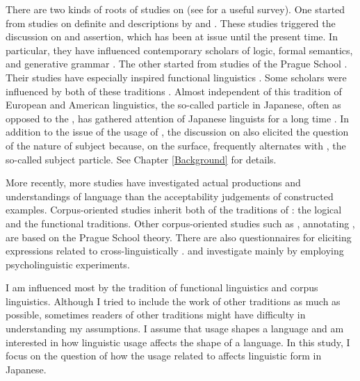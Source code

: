 There are two kinds of roots of studies on 
(see  for a useful survey).
One started from studies on definite and  descriptions by  and .
These studies triggered the discussion on  and assertion,
which has been at issue until the present time.
In particular, they have influenced contemporary scholars of logic, formal semantics, and generative grammar \cite{chomsky65,jackendoff72,selkirk84,rooth85,rizzi97,erteschik-shir97,erteschik-shir07,buring07,ishihara11,krifkamusan12,endo14}.
The other started from studies of the Prague School \cite{mathesius28,mathesius29,sgall67,firbas75}.
Their studies have especially inspired functional linguistics
\cite{bolinger65,halliday67,kuno73,gundel74,chafe76,chafe94,prince81,givon83,tomlin86,lambrecht94,birnerward98,birnerward09}.
Some scholars were influenced by both of these traditions
\cite{vallduvi90,steedman91,vallduvivilkuna98}.%
Almost independent of this tradition of European and American linguistics,
the so-called  particle  in Japanese,
often as opposed to the  ,
has gathered attention of Japanese linguists for a long time \cite{matsushita28,yamada36,tokieda50,mikami53,mikami60,onoe81,kinsui95,kikuchi95,noda96,masuoka00,masuoka12}.
In addition to the issue of the usage of ,
the discussion on  also elicited the question of the nature of subject
because, on the surface,  frequently alternates with ,
the so-called subject particle.
See Chapter \ref{Background} for details.

More recently,
more studies have investigated actual productions and understandings of language than the acceptability judgements of constructed examples.
Corpus-oriented studies  
\cite[e.g.,][]{calhounetal05,gotzeetal07,chiarcosetal11}
inherit both of the traditions of :
the logical and the functional traditions.
Other corpus-oriented studies such as ,
annotating , are based on the Prague School theory.
There are also questionnaires for eliciting expressions related to  cross-linguistically \cite{skopeteasetal06}.
 and  investigate  mainly by employing psycholinguistic experiments.

I am influenced most by the tradition of functional linguistics and corpus linguistics.
Although I tried to include the work of other traditions as much as possible, sometimes readers of other traditions might have difficulty in understanding my assumptions.
I assume that usage shapes a language \cite{givon76,comrie83,comrie89,bybeehopper01} and
am interested in how linguistic usage affects the shape of a language.
In this study,
I focus on the question of how the usage related to  affects linguistic form in Japanese.


